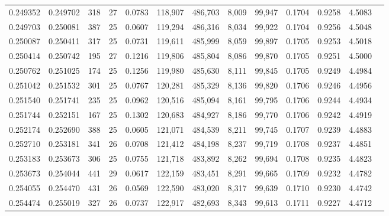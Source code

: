 \begin{tabular}{rrrrrrrrrrrrr}
0.249352 & 0.249702 &   318 &  27 &                                     0.0783 & 118,907 & 486,703 &   8,009 &  99,947 & 0.1704 & 0.9258 & 4.5083 \\
0.249703 & 0.250081 &   387 &  25 &                                     0.0607 & 119,294 & 486,316 &   8,034 &  99,922 & 0.1704 & 0.9256 & 4.5048 \\
0.250087 & 0.250411 &   317 &  25 &                                     0.0731 & 119,611 & 485,999 &   8,059 &  99,897 & 0.1705 & 0.9253 & 4.5018 \\
0.250414 & 0.250742 &   195 &  27 &                                     0.1216 & 119,806 & 485,804 &   8,086 &  99,870 & 0.1705 & 0.9251 & 4.5000 \\
0.250762 & 0.251025 &   174 &  25 &                                     0.1256 & 119,980 & 485,630 &   8,111 &  99,845 & 0.1705 & 0.9249 & 4.4984 \\
0.251042 & 0.251532 &   301 &  25 &                                     0.0767 & 120,281 & 485,329 &   8,136 &  99,820 & 0.1706 & 0.9246 & 4.4956 \\
0.251540 & 0.251741 &   235 &  25 &                                     0.0962 & 120,516 & 485,094 &   8,161 &  99,795 & 0.1706 & 0.9244 & 4.4934 \\
0.251744 & 0.252151 &   167 &  25 &                                     0.1302 & 120,683 & 484,927 &   8,186 &  99,770 & 0.1706 & 0.9242 & 4.4919 \\
0.252174 & 0.252690 &   388 &  25 &                                     0.0605 & 121,071 & 484,539 &   8,211 &  99,745 & 0.1707 & 0.9239 & 4.4883 \\
0.252710 & 0.253181 &   341 &  26 &                                     0.0708 & 121,412 & 484,198 &   8,237 &  99,719 & 0.1708 & 0.9237 & 4.4851 \\
0.253183 & 0.253673 &   306 &  25 &                                     0.0755 & 121,718 & 483,892 &   8,262 &  99,694 & 0.1708 & 0.9235 & 4.4823 \\
0.253673 & 0.254044 &   441 &  29 &                                     0.0617 & 122,159 & 483,451 &   8,291 &  99,665 & 0.1709 & 0.9232 & 4.4782 \\
0.254055 & 0.254470 &   431 &  26 &                                     0.0569 & 122,590 & 483,020 &   8,317 &  99,639 & 0.1710 & 0.9230 & 4.4742 \\
0.254474 & 0.255019 &   327 &  26 &                                     0.0737 & 122,917 & 482,693 &   8,343 &  99,613 & 0.1711 & 0.9227 & 4.4712 \\

\end{tabular}
